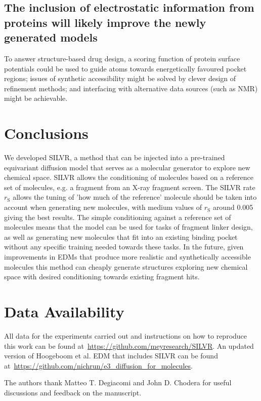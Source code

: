 \documentclass[journal=jacsat,manuscript=article]{achemso}
\begin{document}
\subsection{The inclusion of electrostatic information from proteins will likely improve the newly generated models}
To answer structure-based drug design, a scoring function of protein surface potentials could be used to guide atoms towards energetically favoured pocket regions; issues of synthetic accessibility might be solved by clever design of refinement methods; and interfacing with alternative data sources (such as NMR) might be achievable. 


\section{Conclusions}
We developed SILVR, a method that can be injected into a pre-trained equivariant diffusion model that serves as a molecular generator to explore new chemical space. SILVR allows the conditioning of molecules based on a reference set of molecules, e.g. a fragment from an X-ray fragment screen. The SILVR rate $r_{\mathrm{S}}$ allows the tuning of 'how much of the reference' molecule should be taken into account when generating new molecules, with medium values of $r_{\mathrm{S}}$ around 0.005 giving the best results. The simple conditioning against a reference set of molecules means that the model can be used for tasks of fragment linker design, as well as generating new molecules that fit into an existing binding pocket without any specific training needed towards these tasks. In the future, given improvements in EDMs that produce more realistic and synthetically accessible molecules this method can cheaply generate structures exploring new chemical space with desired conditioning towards existing fragment hits.

\section{Data Availability}
All data for the experiments carried out and instructions on how to reproduce this work can be found at~\url{https://github.com/meyresearch/SILVR}. An updated version of Hoogeboom et al. EDM that includes SILVR can be found at~\url{https://github.com/nichrun/e3_diffusion_for_molecules}.

\begin{acknowledgement}
The authors thank Matteo T. Degiacomi and John D. Chodera for useful discussions and feedback on the manuscript. 
\end{acknowledgement}
\end{document}

